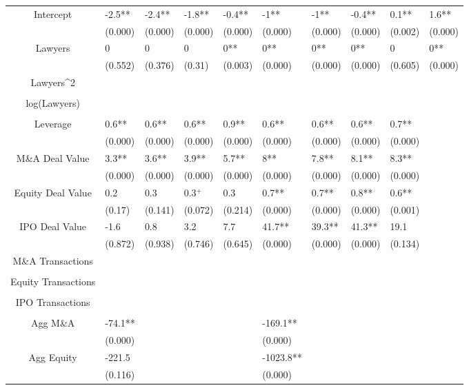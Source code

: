 \documentclass{article}
\begin{document}
\begin{table}[H]
\begin{tabular}{|clllllllll|}
Intercept & -2.5** & -2.4** & -1.8** & -0.4** & -1** & -1** & -0.4** & 0.1** & 1.6** \\
   & (0.000) & (0.000) & (0.000) & (0.000) & (0.000) & (0.000) & (0.000) & (0.002) & (0.000) \\
  Lawyers & 0 & 0 & 0 & 0** & 0** & 0** & 0** & 0 & 0** \\
   & (0.552) & (0.376) & (0.31) & (0.003) & (0.000) & (0.000) & (0.000) & (0.605) & (0.000) \\
  Lawyers^2 &  &  &  &  &  &  &  &  &  \\
   &  &  &  &  &  &  &  &  &  \\
  log(Lawyers) &  &  &  &  &  &  &  &  &  \\
   &  &  &  &  &  &  &  &  &  \\
  Leverage & 0.6** & 0.6** & 0.6** & 0.9** & 0.6** & 0.6** & 0.6** & 0.7** &  \\
   & (0.000) & (0.000) & (0.000) & (0.000) & (0.000) & (0.000) & (0.000) & (0.000) &  \\
  M\&A Deal Value & 3.3** & 3.6** & 3.9** & 5.7** & 8** & 7.8** & 8.1** & 8.3** &  \\
   & (0.000) & (0.000) & (0.000) & (0.000) & (0.000) & (0.000) & (0.000) & (0.000) &  \\
  Equity Deal Value & 0.2 & 0.3 & 0.3$^{+}$ & 0.3 & 0.7** & 0.7** & 0.8** & 0.6** &  \\
   & (0.17) & (0.141) & (0.072) & (0.214) & (0.000) & (0.000) & (0.000) & (0.001) &  \\
  IPO Deal Value & -1.6 & 0.8 & 3.2 & 7.7 & 41.7** & 39.3** & 41.3** & 19.1 &  \\
   & (0.872) & (0.938) & (0.746) & (0.645) & (0.000) & (0.000) & (0.000) & (0.134) &  \\
  M\&A Transactions &  &  &  &  &  &  &  &  &  \\
   &  &  &  &  &  &  &  &  &  \\
  Equity Transactions &  &  &  &  &  &  &  &  &  \\
   &  &  &  &  &  &  &  &  &  \\
  IPO Transactions &  &  &  &  &  &  &  &  &  \\
   &  &  &  &  &  &  &  &  &  \\
  Agg M\&A & -74.1** &  &  &  & -169.1** &  &  &  &  \\
   & (0.000) &  &  &  & (0.000) &  &  &  &  \\
  Agg Equity & -221.5 &  &  &  & -1023.8** &  &  &  &  \\
   & (0.116) &  &  &  & (0.000) &  &  &  &  \\

\end{tabular}
\end{table}
\end{document}
